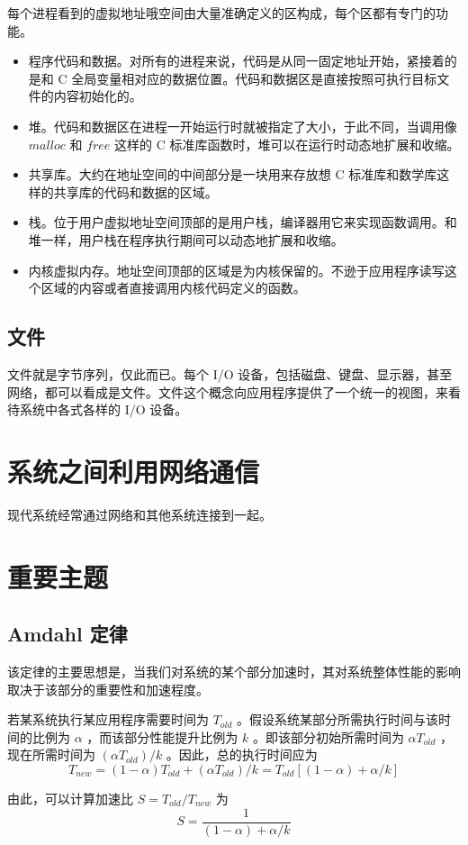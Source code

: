 每个进程看到的虚拟地址哦空间由大量准确定义的区构成，每个区都有专门的功能。

\begin{itemize}
    \item 程序代码和数据。对所有的进程来说，代码是从同一固定地址开始，紧接着的是和 C 全局变量相对应的数据位置。代码和数据区是直接按照可执行目标文件的内容初始化的。
    \item 堆。代码和数据区在进程一开始运行时就被指定了大小，于此不同，当调用像 $malloc$ 和 $free$ 这样的 C 标准库函数时，堆可以在运行时动态地扩展和收缩。
    \item 共享库。大约在地址空间的中间部分是一块用来存放想 C 标准库和数学库这样的共享库的代码和数据的区域。
    \item 栈。位于用户虚拟地址空间顶部的是用户栈，编译器用它来实现函数调用。和堆一样，用户栈在程序执行期间可以动态地扩展和收缩。
    \item 内核虚拟内存。地址空间顶部的区域是为内核保留的。不逊于应用程序读写这个区域的内容或者直接调用内核代码定义的函数。
\end{itemize}

\subsection{文件}

文件就是字节序列，仅此而已。每个 I/O 设备，包括磁盘、键盘、显示器，甚至网络，都可以看成是文件。文件这个概念向应用程序提供了一个统一的视图，来看待系统中各式各样的 I/O 设备。

\section{系统之间利用网络通信}

现代系统经常通过网络和其他系统连接到一起。

\section{重要主题}

\subsection{Amdahl 定律}

该定律的主要思想是，当我们对系统的某个部分加速时，其对系统整体性能的影响取决于该部分的重要性和加速程度。

\begin{theorem}
    若某系统执行某应用程序需要时间为 $T_{old}$ 。假设系统某部分所需执行时间与该时间的比例为 $\alpha$ ，而该部分性能提升比例为 $k$ 。即该部分初始所需时间为 $\alpha T_{old}$ ，现在所需时间为 $(\alpha T_{old}) / k$ 。因此，总的执行时间应为
    \[
        T_{new} = (1 - \alpha) T_{old} + (\alpha T_{old}) / k = T_{old}[(1 - \alpha) + \alpha / k]
    \]

    由此，可以计算加速比 $S = T_{old} / T_{new}$ 为
    \begin{equation}
        S = \frac{1}{(1 - \alpha) + \alpha / k}
    \end{equation}
\end{theorem}

